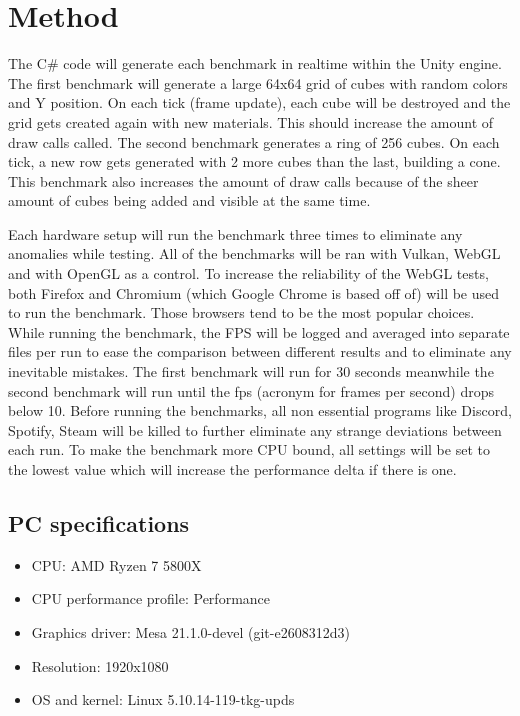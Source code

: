\documentclass{article}
\begin{document}
\section {Method}
The C\# code will generate each benchmark in realtime within the Unity engine. The first benchmark will generate a large 64x64 grid of cubes with random colors and Y position. On each tick (frame update), each cube will be destroyed and the grid gets created again with new materials. This should increase the amount of draw calls called. The second benchmark generates a ring of 256 cubes. On each tick, a new row gets generated with 2 more cubes than the last, building a cone. This benchmark also increases the amount of draw calls because of the sheer amount of cubes being added and visible at the same time.

Each hardware setup will run the benchmark three times to eliminate any anomalies while testing. All of the benchmarks will be ran with Vulkan, WebGL and with OpenGL as a control. To increase the reliability of the WebGL tests, both Firefox and Chromium (which Google Chrome is based off of) will be used to run the benchmark. Those browsers tend to be the most popular choices\cite{WebBrowsers}. While running the benchmark, the FPS will be logged and averaged into separate files per run to ease the comparison between different results and to eliminate any inevitable mistakes. The first benchmark will run for 30 seconds meanwhile the second benchmark will run until the fps (acronym for frames per second) drops below 10. Before running the benchmarks, all non essential programs like Discord, Spotify, Steam will be killed to further eliminate any strange deviations between each run. To make the benchmark more CPU bound, all settings will be set to the lowest value which will increase the performance delta if there is one.

\subsection {PC specifications}
\begin{itemize}
    \item CPU: AMD Ryzen 7 5800X
    \item CPU performance profile: Performance
    \item Graphics driver: Mesa 21.1.0-devel (git-e2608312d3)
    \item Resolution: 1920x1080
    \item OS and kernel: Linux 5.10.14-119-tkg-upds
\end{itemize}
\end{document}
